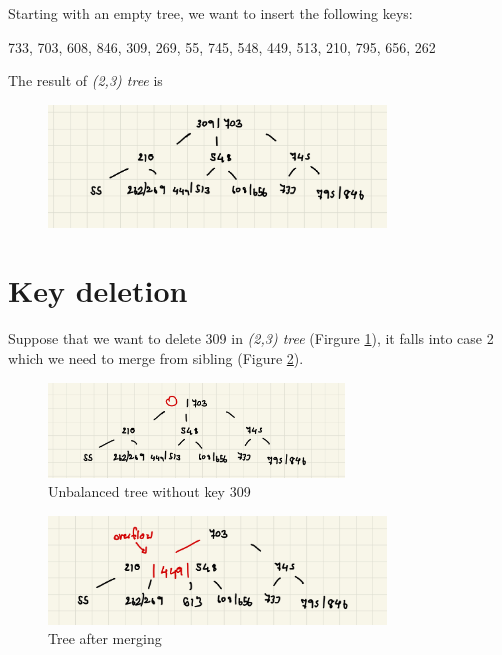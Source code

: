 \documentclass[a4paper, 12pt]{report}
\begin{document}
Starting with an empty tree, we want to insert the following keys:
\begin{center}
        733, 703, 608, 846, 309, 269, 55, 745, 548, 449, 513, 210, 795, 656, 262
\end{center}

The result of \emph{(2,3) tree} is

\begin{figure}[h]
        \centering
        \includegraphics[width=0.8\textwidth,scale=0.5]{tree_insertion.jpeg}
\end{figure}

\section{Key deletion}

\noindent Suppose that we want to delete 309 in \emph{(2,3) tree} (Firgure \ref{fig:tree-deletion-1}), it falls into case 2 which 
we need to merge from sibling (Figure \ref{fig:tree-deletion-2}).

\begin{figure}[h]
        \centering
        \includegraphics[width=0.7\textwidth,scale=0.5]{tree_deletion_1.jpeg}
        \caption{\label{fig:tree-deletion-1} Unbalanced tree without key 309}
\end{figure}

\begin{figure}[h]
        \centering
        \includegraphics[width=0.8\textwidth,scale=0.5]{tree_deletion_2.jpeg}
        \caption{\label{fig:tree-deletion-2} Tree after merging}
\end{figure}
\end{document}
